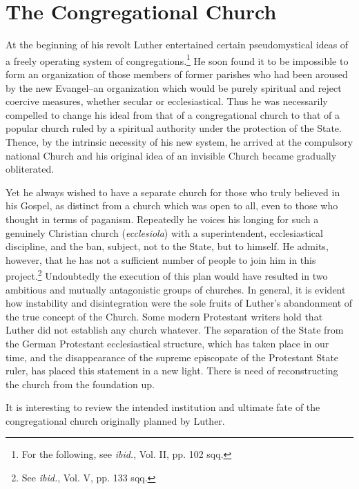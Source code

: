 \section{The Congregational Church}

At the beginning of his revolt Luther entertained certain pseudomystical
ideas of a freely operating system of congregations.\footnote
{For the following, see \textit{ibid.}, Vol. II, pp. 102 sqq.}
He soon found it to be impossible to form an organization of those
members of former parishes who had been aroused by the new
Evangel--an organization which would be purely spiritual and reject
coercive measures, whether secular or ecclesiastical. Thus he was
necessarily compelled to change his ideal from that of a congregational
church to that of a popular church ruled by a spiritual
authority under the protection of the State. Thence, by the intrinsic
necessity of his new system, he arrived at the compulsory national
Church and his original idea of an invisible Church became gradually obliterated.

Yet he always wished to have a separate church for those who
truly believed in his Gospel, as distinct from a church which was
open to all, even to those who thought in terms of paganism. Repeatedly
he voices his longing for such a genuinely Christian church
(\textit{ecclesiola}) with a superintendent, ecclesiastical discipline, and the
ban, subject, not to the State, but to himself. He admits, however,
that he has not a sufficient number of people to join him in this
project.\footnote{See \textit{ibid.}, Vol. V, pp. 133 sqq.}
Undoubtedly the execution of this plan would have resulted
in two ambitious and mutually antagonistic groups of
churches. In general, it is evident how instability and disintegration
were the sole fruits of Luther’s abandonment of the true concept
of the Church. Some modern Protestant writers hold that Luther
did not establish any church whatever. The separation of the State
from the German Protestant ecclesiastical structure, which has taken
place in our time, and the disappearance of the supreme episcopate
of the Protestant State ruler, has placed this statement in a new
light. There is need of reconstructing the church from the foundation up.

It is interesting to review the intended institution and ultimate
fate of the congregational church originally planned by Luther.

